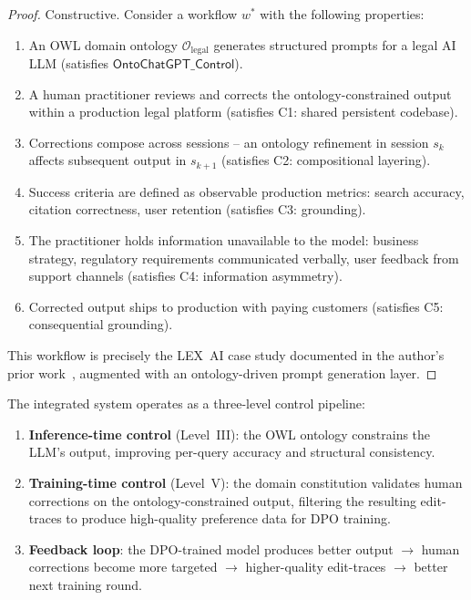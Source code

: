 \documentclass[11pt]{article}
\begin{document}
\begin{proof}
Constructive.
Consider a workflow $w^*$ with the following properties:
\begin{enumerate}[nosep]
  \item An OWL domain ontology $\mathcal{O}_{\text{legal}}$ generates structured prompts for a legal AI LLM (satisfies $\mathsf{OntoChatGPT\_Control}$).
  \item A human practitioner reviews and corrects the ontology-constrained output within a production legal platform (satisfies C1: shared persistent codebase).
  \item Corrections compose across sessions -- an ontology refinement in session $s_k$ affects subsequent output in $s_{k+1}$ (satisfies C2: compositional layering).
  \item Success criteria are defined as observable production metrics: search accuracy, citation correctness, user retention (satisfies C3: grounding).
  \item The practitioner holds information unavailable to the model: business strategy, regulatory requirements communicated verbally, user feedback from support channels (satisfies C4: information asymmetry).
  \item Corrected output ships to production with paying customers (satisfies C5: consequential grounding).
\end{enumerate}
This workflow is precisely the LEX~AI case study documented in the author's prior work~\citep{ovcharov2025citation,ovcharov2025statute}, augmented with an ontology-driven prompt generation layer.
\end{proof}

The integrated system operates as a three-level control pipeline:

\begin{enumerate}[nosep]
  \item \textbf{Inference-time control} (Level~III): the OWL ontology constrains the LLM's output, improving per-query accuracy and structural consistency.
  \item \textbf{Training-time control} (Level~V): the domain constitution validates human corrections on the ontology-constrained output, filtering the resulting edit-traces to produce high-quality preference data for DPO training.
  \item \textbf{Feedback loop}: the DPO-trained model produces better output $\to$ human corrections become more targeted $\to$ higher-quality edit-traces $\to$ better next training round.
\end{enumerate}
\end{document}
